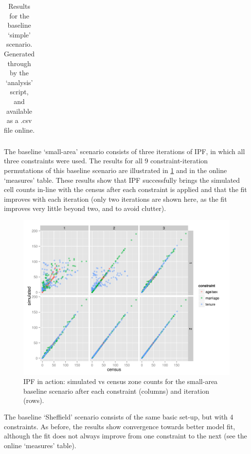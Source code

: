 \documentclass[a4paper,10pt]{article}
\begin{document}
\begin{table}[htbp]
\caption{Results for the baseline `simple' scenario. Generated through by the ‘analysis’ script, and available as a .csv file online.}
\begin{center}
\begin{tabular}{rrrrr}
\toprule
\bottomrule
\end{tabular}
\end{center}
\label{tblresults1}
\end{table}

The baseline `small-area' scenario consists of three
 iterations of IPF, in which all three constraints were 
used. The results for all 9 constraint-iteration permutations 
of this baseline scenario are illustrated in \cref{fipfinac} and %
in the online `measures' table. These results show that IPF successfully 
brings the simulated cell counts in-line with the census after each constraint 
is applied and that the fit improves with each iteration (only two iterations are 
shown here, as the fit improves very little beyond two, and to avoid clutter).

\begin{figure}
 \begin{center}
  \includegraphics[width=12cm]{ipfinac}
 \end{center}
\caption{IPF in action: simulated vs census zone counts for the small-area baseline scenario after each constraint (columns) and iteration (rows).}
\label{fipfinac}
\end{figure}

The baseline `Sheffield' scenario consists of the same basic set-up, 
but with 4 constraints. As before, the results show convergence 
towards better model fit, although the fit does not always improve 
from one constraint to the next (see the online `measures' table). %
\end{document}
